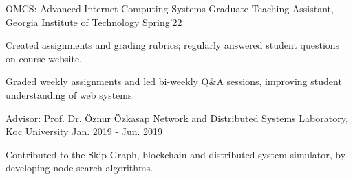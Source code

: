 
\begin{cventries}
   \cventry
    {OMCS: Advanced Internet Computing Systems } %
    {Graduate Teaching Assistant, Georgia Institute of Technology} %
    {}
    {Spring'22} %
    {
      \begin{cvitems} %
        \item {Created assignments and grading rubrics; regularly answered student questions on course website.}
        \item {Graded weekly assignments and led bi-weekly Q\&A sessions, improving student understanding of web systems.}
      \end{cvitems}
    }

  \cventry
    {Advisor: Prof. Dr. Öznur Özkasap} %
    {Network and Distributed Systems Laboratory, Koc University} %
    {}
    {Jan. 2019 - Jun. 2019} %
    {
      \begin{cvitems} %
      \item {Contributed to the Skip Graph, blockchain and distributed system simulator, by developing node search algorithms.}
      \end{cvitems}
    }


\end{cventries}
